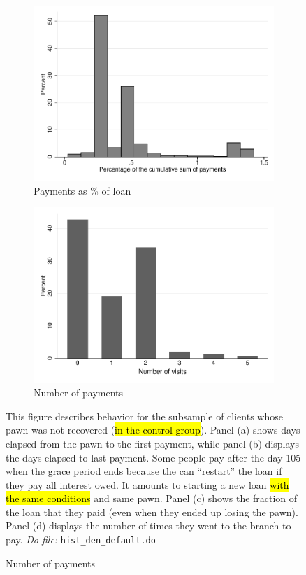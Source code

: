 \documentclass[11pt]{article}
\begin{document}
\begin{figure}[H]
\begin{center}
\begin{subfigure}{0.40\textwidth}
        \caption{Payments as \% of loan}
        \centering
        \includegraphics[width=\textwidth]{Figuras/hist_percpay_default.pdf}
    \end{subfigure}
    \begin{subfigure}{0.40\textwidth}
        \caption{Number of payments}
        \centering
        \includegraphics[width=\textwidth]{Figuras/hist_numpay_default.pdf}
    \end{subfigure}
    \end{center}
        \scriptsize 
        This figure describes behavior for the subsample of clients whose pawn was not recovered (\hl{in the control group}).  Panel (a) shows days elapsed from the pawn to the first payment, while panel (b) displays the days elapsed to last payment. Some people pay after the day 105 when the grace period ends because the can ``restart'' the loan if they pay all interest owed. It amounts to starting a new loan \hl{with the same conditions} and same pawn. Panel (c) shows the fraction of the loan that they paid (even when they ended up losing the pawn). Panel (d) displays the number of times they went to the branch to pay.      
      \textit{Do file: }  \texttt{hist\_den\_default.do}
\end{figure}
\end{document}
